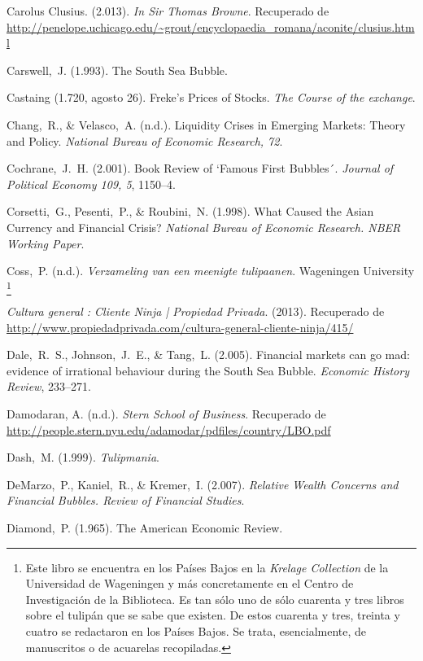 \begin{thebibliography}{11}
	\bibitem{}
		Carolus Clusius. (2.013). \emph{In Sir Thomas Browne}. Recuperado de \url{http://penelope.uchicago.edu/~grout/encyclopaedia\_romana/aconite/clusius.html}

	\bibitem{}
		Carswell, J. (1.993). The South Sea Bubble. 

	\bibitem{}
		Castaing (1.720, agosto 26). Freke’s Prices of Stocks. \emph{The Course of the exchange}. 	

	\bibitem{}
		Chang, R., \& Velasco, A. (n.d.). Liquidity Crises in Emerging Markets: Theory and Policy. \emph{National Bureau of Economic Research, 72}. 

	\bibitem{}
		Cochrane, J. H. (2.001). Book Review of `Famous First Bubbles´. \emph{Journal of Political Economy 109, 5}, 1150–4. 	

	\bibitem{}
		Corsetti, G., Pesenti, P., \& Roubini, N. (1.998). What Caused the Asian Currency and Financial Crisis? \emph{National Bureau of Economic Research. NBER Working Paper}. 

	\bibitem{}
		Coss, P. (n.d.). \emph{Verzameling van een meenigte tulipaanen}. Wageningen University	\footnote{Este libro se encuentra en los Países Bajos en la \emph{Krelage Collection} de la Universidad de Wageningen y más concretamente en el Centro de Investigación de la Biblioteca. Es tan sólo uno de sólo cuarenta y tres libros sobre el tulipán que se sabe que existen. De estos cuarenta y tres, treinta y cuatro se redactaron en los Países Bajos. Se trata, esencialmente, de manuscritos o de acuarelas recopiladas.}

	\bibitem{}
		\emph{Cultura general : Cliente Ninja | Propiedad Privada}. (2013). Recuperado de \url{http://www.propiedadprivada.com/cultura-general-cliente-ninja/415/}

	\bibitem{}
		Dale, R. S., Johnson, J. E., \& Tang, L. (2.005). Financial markets can go mad: evidence of irrational behaviour during the South Sea Bubble. \emph{Economic History Review}, 233–271.	

	\bibitem{}
		Damodaran, A. (n.d.). \emph{Stern School of Business}. Recuperado de \url{http://people.stern.nyu.edu/adamodar/pdfiles/country/LBO.pdf}

	\bibitem{}
		Dash, M. (1.999). \emph{Tulipmania}. 

	\bibitem{}
		DeMarzo, P., Kaniel, R., \& Kremer, I. (2.007). \emph{Relative Wealth Concerns and Financial Bubbles. Review of Financial Studies}. 

	\bibitem{}
		Diamond, P. (1.965). The American Economic Review. 


\end{thebibliography}
